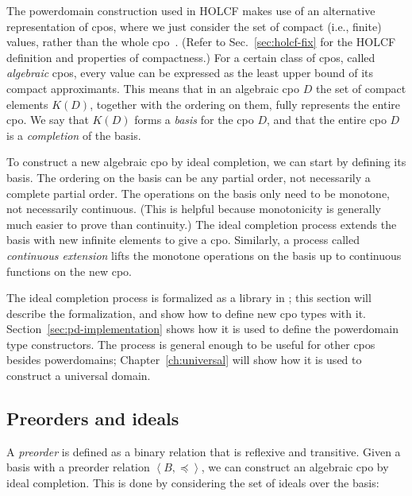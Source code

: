 The powerdomain construction used in HOLCF makes use of an alternative representation of cpos, where we just consider the set of compact (i.e., finite) values, rather than the whole cpo~\cite[\S2.2.6]{abramsky94domain}. (Refer to Sec.~\ref{sec:holcf-fix} for the HOLCF definition and properties of compactness.) For a certain class of cpos, called \emph{algebraic} cpos, every value can be expressed as the least upper bound of its compact approximants. This means that in an algebraic cpo $D$ the set of compact elements $K(D)$, together with the ordering on them, fully represents the entire cpo. We say that $K(D)$ forms a \emph{basis} for the cpo $D$, and that the entire cpo $D$ is a \emph{completion} of the basis.

To construct a new algebraic cpo by ideal completion, we can start by defining its basis. The ordering on the basis can be any partial order, not necessarily a complete partial order. The operations on the basis only need to be monotone, not necessarily continuous. (This is helpful because monotonicity is generally much easier to prove than continuity.)  The ideal completion process extends the basis with new infinite elements to give a cpo. Similarly, a process called \emph{continuous extension} lifts the monotone operations on the basis up to continuous functions on the new cpo.

The ideal completion process is formalized as a library in ; this section will describe the formalization, and show how to define new cpo types with it. Section~\ref{sec:pd-implementation} shows how it is used to define the powerdomain type constructors. The process is general enough to be useful for other cpos besides powerdomains; Chapter~\ref{ch:universal} will show how it is used to construct a universal domain.

\subsection{Preorders and ideals}

A \emph{preorder} is defined as a binary relation that is reflexive and transitive. Given a basis with a preorder relation $\left\langle B,\preceq\right\rangle$, we can construct an algebraic cpo by ideal completion. This is done by considering the set of ideals over the basis:

